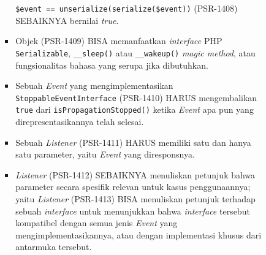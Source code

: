 \documentclass[a4paper,twoside]{article}
\begin{document}
\begin{enumerate}
\begin{enumerate}
\begin{itemize}
\begin{itemize}
					\verb|$event == unserialize(serialize($event))| (PSR-1408) SEBAIKNYA bernilai  \textit{true}.
					\item Objek (PSR-1409) BISA memanfaatkan \textit{interface} PHP \verb|Serializable|, \verb|__sleep()| atau \verb|__wakeup()| \textit{magic method}, atau fungsionalitas bahasa yang serupa jika dibutuhkan.
					\item Sebuah \textit{Event} yang mengimplementasikan \verb|StoppableEventInterface| (PSR-1410) HARUS mengembalikan \verb|true| dari \verb|isPropagationStopped()| ketika \textit{Event} apa pun yang direpresentasikannya telah selesai.
					\item Sebuah \textit{Listener} (PSR-1411) HARUS memiliki satu dan hanya satu parameter, yaitu \textit{Event} yang diresponsnya.
					\item \textit{Listener} (PSR-1412) SEBAIKNYA menuliskan petunjuk bahwa parameter secara spesifik relevan untuk kasus penggunaannya; yaitu \textit{Listener} (PSR-1413) BISA menuliskan petunjuk terhadap sebuah \textit{interface} untuk menunjukkan bahwa \textit{interface} tersebut kompatibel dengan semua jenis \textit{Event} yang mengimplementasikannya, atau dengan implementasi khusus dari antarmuka tersebut.
				\end{itemize}
				

\end{itemize}
\end{enumerate}
\end{enumerate}
\end{document}
